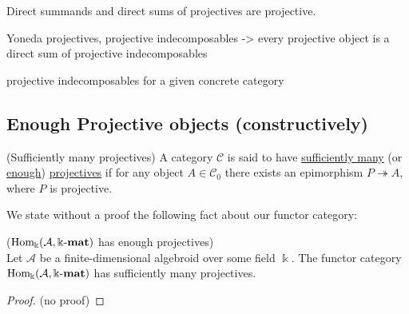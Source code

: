 Direct summands and direct sums of projectives are projective.

Yoneda projectives, projective indecomposables -> every projective object is a direct sum of projective indecomposables

projective indecomposables for a given concrete category


\subsection{Enough Projective objects (constructively)}

\begin{definition}{(Sufficiently many projectives)}\label{def:enough_projectives}
A category $\mathcal{C}$ is said to have \ul{sufficiently many} (or \ul{enough}) \ul{projectives} if for any object $A \in \mathcal{C}_{0}$
there exists an epimorphism $P \twoheadrightarrow A$, where $P$ is projective.
\end{definition}

We state without a proof the following fact about our functor category:

\begin{theorem}{($\mathrm{Hom_{\Bbbk}}(\mathcal{A},\Bbbk\textnormal{-}\mathbf{mat})$ has enough projectives)}\\
Let $\mathcal{A}$ be a finite-dimensional algebroid over some field $\Bbbk$. The functor category $\mathrm{Hom_{\Bbbk}}(\mathcal{A},\Bbbk\textnormal{-}\mathbf{mat})$ has sufficiently many
projectives.
\end{theorem}
\begin{proof}
(no proof)
\end{proof}